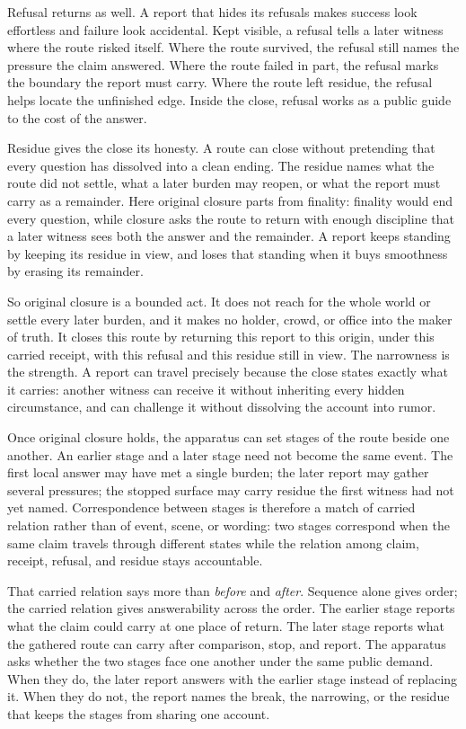 Refusal returns as well. A report that hides its refusals makes success look
effortless and failure look accidental. Kept visible, a refusal tells a later
witness where the route risked itself. Where the route survived, the refusal
still names the pressure the claim answered. Where the route failed in part, the
refusal marks the boundary the report must carry. Where the route left residue,
the refusal helps locate the unfinished edge. Inside the close, refusal works as
a public guide to the cost of the answer.

Residue gives the close its honesty. A route can close without pretending that
every question has dissolved into a clean ending. The residue names what the
route did not settle, what a later burden may reopen, or what the report must
carry as a remainder. Here original closure parts from finality: finality would
end every question, while closure asks the route to return with enough
discipline that a later witness sees both the answer and the remainder. A report
keeps standing by keeping its residue in view, and loses that standing when it
buys smoothness by erasing its remainder.

So original closure is a bounded act. It does not reach for the whole world or
settle every later burden, and it makes no holder, crowd, or office into the
maker of truth. It closes this route by returning this report to this origin,
under this carried receipt, with this refusal and this residue still in view.
The narrowness is the strength. A report can travel precisely because the close
states exactly what it carries: another witness can receive it without
inheriting every hidden circumstance, and can challenge it without dissolving
the account into rumor.

Once original closure holds, the apparatus can set stages of the route beside
one another. An earlier stage and a later stage need not become the same event.
The first local answer may have met a single burden; the later report may gather
several pressures; the stopped surface may carry residue the first witness had
not yet named. Correspondence between stages is therefore a match of carried
relation rather than of event, scene, or wording: two stages correspond when the
same claim travels through different states while the relation among claim,
receipt, refusal, and residue stays accountable.

That carried relation says more than \emph{before} and \emph{after}. Sequence
alone gives order; the carried relation gives answerability across the order. The
earlier stage reports what the claim could carry at one place of return. The
later stage reports what the gathered route can carry after comparison, stop, and
report. The apparatus asks whether the two stages face one another under the same
public demand. When they do, the later report answers with the earlier stage
instead of replacing it. When they do not, the report names the break, the
narrowing, or the residue that keeps the stages from sharing one account.

